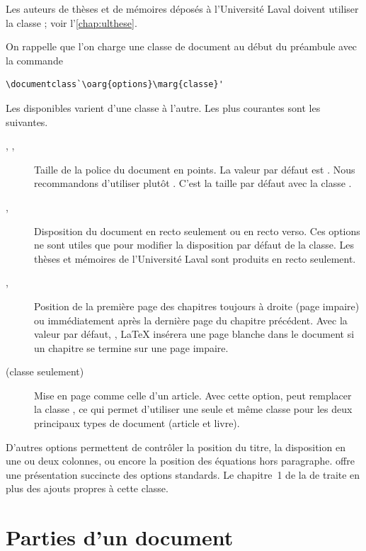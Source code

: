 Les auteurs de thèses et de mémoires déposés à l'Université Laval
doivent utiliser la classe ; voir l'\autoref{chap:ulthese}.

On rappelle que l'on charge une classe de document au début du
préambule avec la commande
\begin{lstlisting}
\documentclass`\oarg{options}\marg{classe}'
\end{lstlisting}
Les  disponibles varient d'une classe à l'autre. Les
plus courantes sont les suivantes.
\begin{description}
\item[\mdseries \code{10pt}, \code{11pt}, \code{12pt}] Taille de la
  police du document en points. La valeur par défaut est \code{10pt}.
  Nous recommandons d'utiliser plutôt \code{11pt}. C'est la taille par
  défaut avec la classe .
\item[\mdseries {}, ] Disposition du
  document en recto seulement ou en recto verso. Ces options ne sont
  utiles que pour modifier la disposition par défaut de la classe. Les
  thèses et mémoires de l'Université Laval sont produits en recto
  seulement.
\item[\mdseries {}, ] Position de la
  première page des chapitres toujours à droite (page impaire) ou
  immédiatement après la dernière page du chapitre précédent. Avec la
  valeur par défaut, , {\LaTeX} insérera une page
  blanche dans le document si un chapitre se termine sur une page
  impaire.
\item[\mdseries {} (classe  seulement)] Mise
  en page comme celle d'un article. Avec cette option, 
  peut remplacer la classe , ce qui permet d'utiliser
  une seule et même classe pour les deux principaux types de document
  (article et livre).
\end{description}

D'autres options permettent de contrôler la position du titre, la
disposition en une ou deux colonnes, ou encore la position des
équations hors paragraphe. \citet{Thurnherr:class-options} offre une
présentation succincte des options standards. Le chapitre~1 de la %
de  traite en plus des ajouts propres à cette classe.



\section{Parties d'un document}


